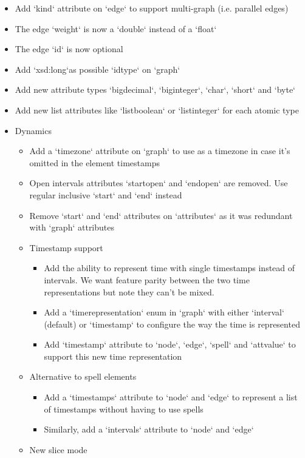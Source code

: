 \documentclass[a4paper,10pt]{article}
\begin{document}
\begin{itemize}
\item Add `kind` attribute on `edge` to support multi-graph (i.e. parallel edges)
\item The edge `weight` is now a `double` instead of a `float`
\item The edge `id` is now optional
\item Add `xsd:long`as possible `idtype` on `\<graph\>`
\item Add new attribute types `bigdecimal`, `biginteger`, `char`, `short` and `byte`
\item Add new list attributes like `listboolean` or `listinteger` for each atomic type
\item Dynamics
\begin{itemize}
\item Add a `timezone` attribute on `\<graph\>` to use as a timezone in case it's omitted in the element timestamps
\item Open intervals attributes `startopen` and `endopen` are removed. Use regular inclusive `start` and `end` instead
\item Remove `start` and `end` attributes on `\<attributes\>` as it was redundant with `\<graph\>` attributes
\item Timestamp support
\begin{itemize}
\item Add the ability to represent time with single timestamps instead of intervals. We want feature parity between the two time representations but note they can't be mixed.
\item Add a `timerepresentation` enum in `\<graph\>` with either `interval` (default) or `timestamp` to configure the way the time is represented
\item Add `timestamp` attribute to `\<node\>`, `\<edge\>`, `\<spell\>` and `\<attvalue\>` to support this new time representation
\end{itemize}
\item Alternative to spell elements
\begin{itemize}
\item Add a `timestamps` attribute to `\<node\>` and `\<edge\>` to represent a list of timestamps without having to use spells
\item Similarly, add a `intervals` attribute to `\<node\>` and `\<edge\>`
\end{itemize}
\item New slice mode
\begin{itemize}

\end{itemize}
\end{itemize}
\end{itemize}
\end{document}
